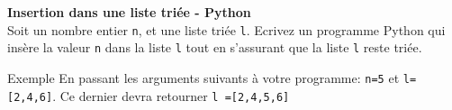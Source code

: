 \begin{Exercice}[15 minutes] \textbf{Insertion dans une liste triée - Python}\\
    Soit un nombre entier \lstinline{n}, et une liste triée \lstinline{l}. Ecrivez un programme Python qui insère la valeur \lstinline{n} dans la liste \lstinline{l} tout en s'assurant que la liste \lstinline{l} reste triée.

    

    \begin{Example}{\faTerminal \quad Exemple}
        En passant les arguments suivants à votre programme: \texttt{n=5} et \texttt{l=[2,4,6]}. Ce dernier devra retourner \lstinline{l =[2,4,5,6]}
    \end{Example}

    \begin{solution}
        
    \end{solution}


\end{Exercice}

